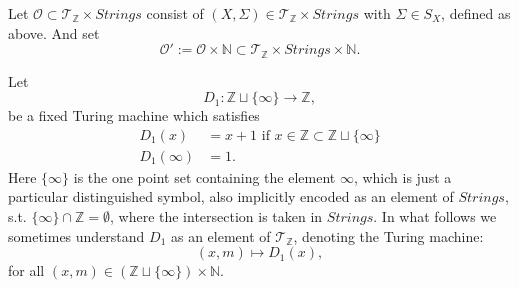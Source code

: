 \documentclass{amsart}  %
\numberwithin{equation}{section}
\theoremstyle{definition}
\theoremstyle{remark}
\begin{document}
{Let $\mathcal{O} \subset  \mathcal{T} _{\mathbb{Z}} \times Strings$ 
consist of $(X, \Sigma) \in \mathcal{T} _{\mathbb{Z}} \times Strings   $ with $\Sigma \in S _{X} $, defined as above. And
set $$\mathcal{O}' := \mathcal{O} \times \mathbb{N} \subset \mathcal{T} _{\mathbb{Z}} \times Strings \times \mathbb{N}.
$$ 
 
Let 
$$D_1: \mathbb{Z} \sqcup \{\infty\}   \to \mathbb{Z}, 
$$ 
be a fixed Turing machine which satisfies 
\begin{align} \label{eq:decision} D_1 (x) & =x+1  \text{ if } x \in  \mathbb{Z} \subset \mathbb{Z} \sqcup \{\infty\}  \\
D_1 (\infty) & =1.
\end{align}
Here $\{\infty\}$ is the one point set containing the element $\infty$,  which is just a particular distinguished symbol, also implicitly encoded as an element of $Strings$, s.t. $\{\infty\} \cap \mathbb{Z} = \emptyset$, where the intersection is taken in $Strings$. In what follows we sometimes understand $D_1 $ as an element of $\mathcal{T} _{\mathbb{Z}}  $, denoting the Turing machine: 
\begin{equation} \label{eq:D1m}
(x,m ) \mapsto D_1 (x), 
\end{equation}
 for all $(x,m) \in (\mathbb{Z} \sqcup \{\infty\}) \times \mathbb{N}$.


}
\end{document}
